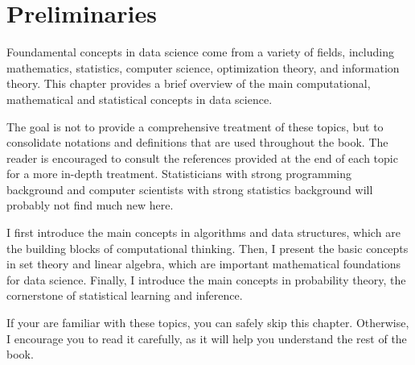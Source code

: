 \chapter{Preliminaries}
\label{chap:preliminaries}


Foundamental concepts in data science come from a variety of fields, including
mathematics, statistics, computer science, optimization theory, and information theory.
This chapter provides a brief overview of the main computational, mathematical and statistical
concepts in data science.

The goal is not to provide a comprehensive treatment of these topics, but to consolidate
notations and definitions that are used throughout the book.  The reader is encouraged to
consult the references provided at the end of each topic for a more in-depth treatment.
Statisticians with strong programming background and computer scientists with strong
statistics background will probably not find much new here.

I first introduce the main concepts in algorithms and data structures, which are the
building blocks of computational thinking.  Then, I present the basic concepts in set
theory and linear algebra, which are important mathematical foundations for data science.
Finally, I introduce the main concepts in probability theory, the cornerstone of
statistical learning and inference.

If your are familiar with these topics, you can safely skip this chapter.  Otherwise, I
encourage you to read it carefully, as it will help you understand the rest of the book.

